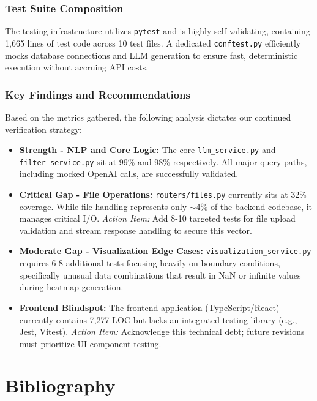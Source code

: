 \documentclass[12pt, titlepage]{article}
\begin{document}
\subsubsection{Test Suite Composition}
The testing infrastructure utilizes \texttt{pytest} and is highly self-validating, containing 1,665 lines of test code across 10 test files. A dedicated \texttt{conftest.py} efficiently mocks database connections and LLM generation to ensure fast, deterministic execution without accruing API costs.

\subsubsection{Key Findings and Recommendations}
Based on the metrics gathered, the following analysis dictates our continued verification strategy:

\begin{itemize}
    \item \textbf{Strength - NLP and Core Logic:} The core \texttt{llm\_service.py} and \texttt{filter\_service.py} sit at 99\% and 98\% respectively. All major query paths, including mocked OpenAI calls, are successfully validated.
    \item \textbf{Critical Gap - File Operations:} \texttt{routers/files.py} currently sits at 32\% coverage. While file handling represents only $\sim$4\% of the backend codebase, it manages critical I/O. \textit{Action Item:} Add 8-10 targeted tests for file upload validation and stream response handling to secure this vector.
    \item \textbf{Moderate Gap - Visualization Edge Cases:} \texttt{visualization\_service.py} requires 6-8 additional tests focusing heavily on boundary conditions, specifically unusual data combinations that result in NaN or infinite values during heatmap generation.
    \item \textbf{Frontend Blindspot:} The frontend application (TypeScript/React) currently contains 7,277 LOC but lacks an integrated testing library (e.g., Jest, Vitest). \textit{Action Item:} Acknowledge this technical debt; future revisions must prioritize UI component testing.
\end{itemize}

\newpage

\section*{Bibliography}

\nocite{*}
\end{document}
